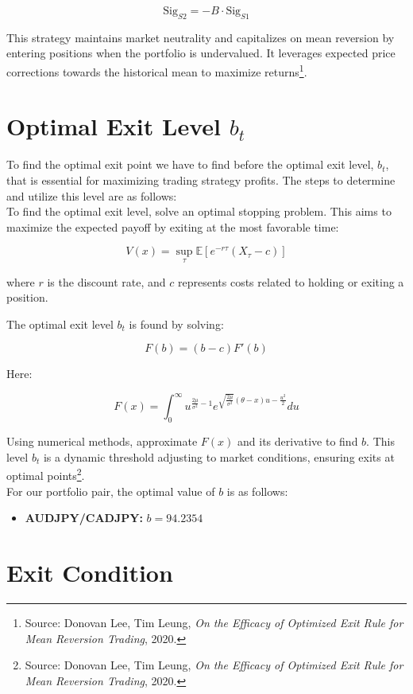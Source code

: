 \documentclass{article}
\begin{document}
\[
\text{Sig}_{S2} = -B \cdot \text{Sig}_{S1}
\]

This strategy maintains market neutrality and capitalizes on mean reversion by entering positions when the portfolio is undervalued. It leverages expected price corrections towards the historical mean to maximize returns\footnote{Source: Donovan Lee, Tim Leung, \textit{On the Efficacy of Optimized Exit Rule for Mean Reversion Trading}, 2020.}.\\

\section*{Optimal Exit Level $b_t$}
To find the optimal exit point we have to find before the optimal exit level, \( b_t \), that is essential for maximizing trading strategy profits. The steps to determine and utilize this level are as follows:\\

To find the optimal exit level, solve an optimal stopping problem. This aims to maximize the expected payoff by exiting at the most favorable time:

\[
V(x) = \sup_{\tau} \mathbb{E} \left[ e^{-r \tau} (X_{\tau} - c) \right]
\]

where \( r \) is the discount rate, and \( c \) represents costs related to holding or exiting a position.

The optimal exit level \( b_t \) is found by solving:

\[
F(b) = (b - c) F'(b)
\]

Here:

\[
F(x) = \int_0^\infty u^{\frac{2\mu}{\sigma^2} - 1} e^{\sqrt{\frac{2\mu}{\sigma^2}} (\theta - x) u - \frac{u^2}{2}} du
\]

Using numerical methods, approximate \( F(x) \) and its derivative to find \( b \). This level \( b_t \) is a dynamic threshold adjusting to market conditions, ensuring exits at optimal points\footnote{Source: Donovan Lee, Tim Leung, \textit{On the Efficacy of Optimized Exit Rule for Mean Reversion Trading}, 2020.}.\\

For our portfolio pair, the optimal value of \( b \) is as follows:
\begin{itemize}
    \item \textbf{AUDJPY/CADJPY:} \( b = 94.2354 \)
\end{itemize}


\section*{Exit Condition}
\end{document}
